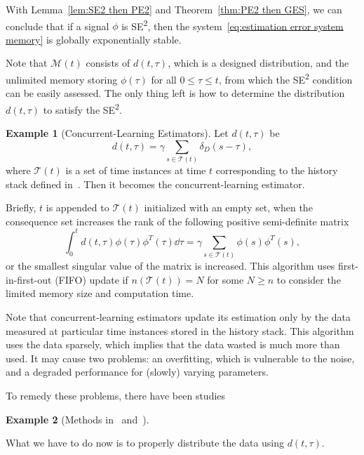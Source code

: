 \documentclass[]{IEEEtran}
\theoremstyle{definition}
\newtheorem{example}{Example}
\theoremstyle{remark}
\newcommand{\MC}[1]{\mathcal{#1}}
\newcommand{\tsup}[1]{\textsuperscript{#1}}
\begin{document}
With Lemma~\ref{lem:SE2 then PE2} and Theorem~\ref{thm:PE2 then GES}, we can
conclude that if a signal $\phi$ is SE\tsup{2}, then the
system~\eqref{eq:estimation error system memory} is globally exponentially
stable.

Note that $\MC{M}(t)$ consists of $d(t, \tau)$, which is a designed
distribution, and the unlimited memory storing $\phi(\tau)$ for all $0 \le \tau
\le t$, from which the SE\tsup{2} condition can be easily assessed. The only
thing left is how to determine the distribution $d(t, \tau)$ to satisfy the
SE\tsup{2}.

\begin{example}[Concurrent-Learning Estimators]
	Let $d(t, \tau)$ be
	\begin{equation*}
		d(t, \tau) = \gamma \sum_{s \in \MC{T}(t)} \delta_D(s - \tau),
	\end{equation*}
	where $\MC{T}(t)$ is a set of time instances at time $t$ corresponding to the
	history stack defined in~\cite{chowdhary_exponential_2014}. Then it becomes
	the concurrent-learning estimator.

	Briefly, $t$ is appended to $\MC{T}(t)$ initialized with an empty set, when
	the consequence set increases the rank of the following positive
	semi-definite matrix
	\begin{equation*}
		\int_0^t d(t, \tau) \phi(\tau) \phi^T(\tau) \dd{\tau} = \gamma \sum_{s \in
		\MC{T}(t)} \phi(s) \phi^T(s),
	\end{equation*}
	or the smallest singular value of the matrix is increased.  This algorithm
	uses first-in-first-out (FIFO) update if $n(\MC{T}(t)) = N$ for some $N \ge
	n$ to consider the limited memory size and computation time.
\end{example}

Note that concurrent-learning estimators update its estimation only by the data
measured at particular time instances stored in the history stack. This
algorithm uses the data sparsely, which implies that the data wasted is much
more than used. It may cause two problems: an overfitting, which is vulnerable
to the noise, and a degraded performance for (slowly) varying parameters.

To remedy these problems, there have been studies 

\begin{example}[Methods in~\cite{cho_composite_2018}
	and~\cite{pan_composite_2018}]
\end{example}

What we have to do now is to properly distribute the data using $d(t,
\tau)$.
\end{document}
